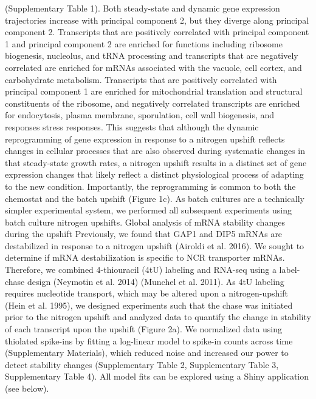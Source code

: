 (Supplementary Table 1). Both steady-state and dynamic gene
expression trajectories increase with principal component 2, but they
diverge along principal component 2. Transcripts that are positively
correlated with principal component 1 and principal component 2 are
enriched for functions including ribosome biogenesis, nucleolus, and
tRNA processing and transcripts that are negatively correlated are
enriched for mRNAs associated with the vacuole, cell cortex, and
carbohydrate metabolism.  Transcripts that are positively correlated
with principal component 1 are enriched for  mitochondrial translation
and structural constituents of the ribosome, and negatively correlated
transcripts are enriched for endocytosis, plasma membrane,
sporulation, cell wall biogenesis, and responses stress responses.
This suggests that although the dynamic reprogramming of gene
expression in response to a nitrogen upshift reflects changes in
cellular processes that are also observed during systematic changes in
that steady-state growth rates, a nitrogen upshift results in a
distinct set of gene expression changes that likely reflect a distinct
physiological process of adapting to the new condition. Importantly,
the reprogramming is common to both the chemostat and the batch
upshift (Figure 1c). As batch cultures are a technically simpler
experimental system, we performed all subsequent experiments using
batch culture nitrogen upshifts.  Global analysis of mRNA stability
changes during the upshift Previously, we found that GAP1 and DIP5
mRNAs are destabilized in response to a nitrogen upshift (Airoldi et
al. 2016). We sought to determine if mRNA destabilization is specific
to NCR transporter mRNAs. Therefore, we combined 4-thiouracil (4tU)
labeling and RNA-seq using a label-chase design (Neymotin et al. 2014)
(Munchel et al. 2011). As 4tU labeling requires nucleotide transport,
which may be altered upon a nitrogen-upshift (Hein et al. 1995), we
designed experiments such that the chase was initiated prior to the
nitrogen upshift and analyzed data to quantify the change in stability
of each transcript upon the upshift (Figure 2a). We normalized data
using thiolated spike-ins by fitting a log-linear model to spike-in
counts across time (Supplementary Materials), which reduced noise and
increased our power to detect stability changes (Supplementary Table
2, Supplementary Table 3, Supplementary Table 4).  All model fits can
be explored using a Shiny application (see below).
  

